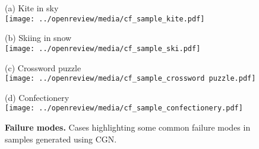 \begin{figure}[H]
    \centering
    \small (a) Kite in sky \\
    \texttt{[image: ../openreview/media/cf\_sample\_kite.pdf]}

    \small (b) Skiing in snow \\
    \texttt{[image: ../openreview/media/cf\_sample\_ski.pdf]}

    \small (c) Crossword puzzle \\
    \texttt{[image: ../openreview/media/cf\_sample\_crossword puzzle.pdf]}

    \small (d) Confectionery \\
    \texttt{[image: ../openreview/media/cf\_sample\_confectionery.pdf]}

    \caption{\textbf{Failure modes.} Cases highlighting some common failure modes in samples generated using CGN.}
    \label{app:failure-cases}
\end{figure}



